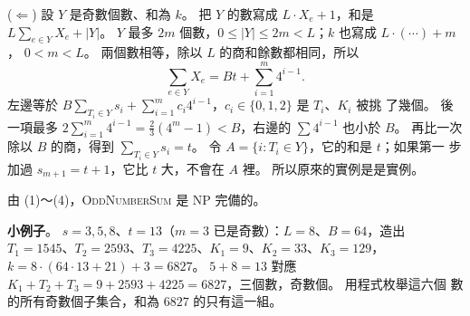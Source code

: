 ($\Leftarrow$) 設 $Y$ 是奇數個數、和為 $k$。 把 $Y$ 的數寫成 $L \cdot X_e + 1$，和是
$L \sum_{e \in Y} X_e + |Y|$。 $Y$ 最多 $2m$ 個數，$0 \le |Y| \le 2m < L$；$k$ 也寫成 $L \cdot (\cdots) + m$，
$0 < m < L$。 兩個數相等，除以 $L$ 的商和餘數都相同，所以
\[
\sum_{e \in Y} X_e = B t + \sum_{i=1}^{m} 4^{i-1}.
\]
左邊等於 $B \sum_{T_i \in Y} s_i + \sum_{i=1}^{m} c_i 4^{i-1}$，$c_i \in \{0, 1, 2\}$ 是 $T_i$、$K_i$ 被挑
了幾個。 後一項最多 $2 \sum_{i=1}^{m} 4^{i-1} = \frac23(4^m - 1) < B$，右邊的 $\sum 4^{i-1}$ 也小於 $B$。
再比一次除以 $B$ 的商，得到 $\sum_{T_i \in Y} s_i = t$。 令 $A = \{i : T_i \in Y\}$，它的和是 $t$；如果第一
步加過 $s_{m+1} = t + 1$，它比 $t$ 大，不會在 $A$ 裡。 所以原來的實例是是實例。

由 (1)～(4)，\textsc{OddNumberSum} 是 NP 完備的。

\textbf{小例子}。 $s = 3, 5, 8$、$t = 13$（$m = 3$ 已是奇數）：$L = 8$、$B = 64$，造出
$T_1 = 1545$、$T_2 = 2593$、$T_3 = 4225$、$K_1 = 9$、$K_2 = 33$、$K_3 = 129$，$k = 8 \cdot (64 \cdot 13 + 21) +
3 = 6827$。 $5 + 8 = 13$ 對應 $K_1 + T_2 + T_3 = 9 + 2593 + 4225 = 6827$，三個數，奇數個。 用程式枚舉這六個
數的所有奇數個子集合，和為 $6827$ 的只有這一組。
